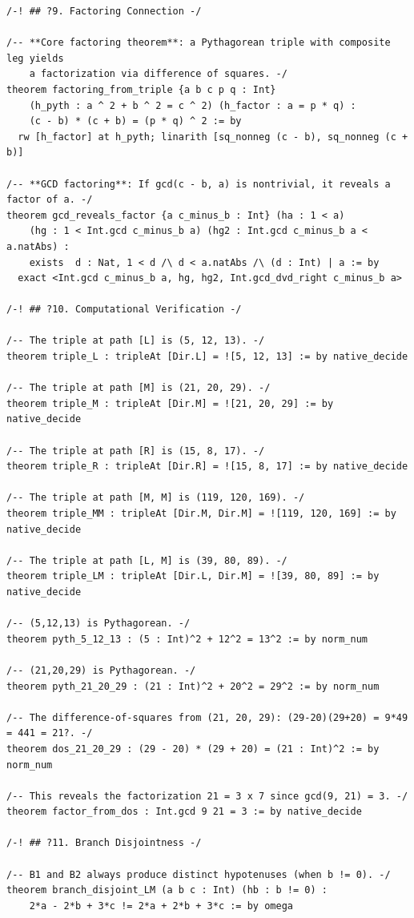 \documentclass[11pt,twoside,openright]{book}
\theoremstyle{definition}
\theoremstyle{remark}
\begin{document}
\begin{lstlisting}[style=lean]
/-! ## ?9. Factoring Connection -/

/-- **Core factoring theorem**: a Pythagorean triple with composite leg yields
    a factorization via difference of squares. -/
theorem factoring_from_triple {a b c p q : Int}
    (h_pyth : a ^ 2 + b ^ 2 = c ^ 2) (h_factor : a = p * q) :
    (c - b) * (c + b) = (p * q) ^ 2 := by
  rw [h_factor] at h_pyth; linarith [sq_nonneg (c - b), sq_nonneg (c + b)]

/-- **GCD factoring**: If gcd(c - b, a) is nontrivial, it reveals a factor of a. -/
theorem gcd_reveals_factor {a c_minus_b : Int} (ha : 1 < a)
    (hg : 1 < Int.gcd c_minus_b a) (hg2 : Int.gcd c_minus_b a < a.natAbs) :
    exists  d : Nat, 1 < d /\ d < a.natAbs /\ (d : Int) | a := by
  exact <Int.gcd c_minus_b a, hg, hg2, Int.gcd_dvd_right c_minus_b a>

/-! ## ?10. Computational Verification -/

/-- The triple at path [L] is (5, 12, 13). -/
theorem triple_L : tripleAt [Dir.L] = ![5, 12, 13] := by native_decide

/-- The triple at path [M] is (21, 20, 29). -/
theorem triple_M : tripleAt [Dir.M] = ![21, 20, 29] := by native_decide

/-- The triple at path [R] is (15, 8, 17). -/
theorem triple_R : tripleAt [Dir.R] = ![15, 8, 17] := by native_decide

/-- The triple at path [M, M] is (119, 120, 169). -/
theorem triple_MM : tripleAt [Dir.M, Dir.M] = ![119, 120, 169] := by native_decide

/-- The triple at path [L, M] is (39, 80, 89). -/
theorem triple_LM : tripleAt [Dir.L, Dir.M] = ![39, 80, 89] := by native_decide

/-- (5,12,13) is Pythagorean. -/
theorem pyth_5_12_13 : (5 : Int)^2 + 12^2 = 13^2 := by norm_num

/-- (21,20,29) is Pythagorean. -/
theorem pyth_21_20_29 : (21 : Int)^2 + 20^2 = 29^2 := by norm_num

/-- The difference-of-squares from (21, 20, 29): (29-20)(29+20) = 9*49 = 441 = 21?. -/
theorem dos_21_20_29 : (29 - 20) * (29 + 20) = (21 : Int)^2 := by norm_num

/-- This reveals the factorization 21 = 3 x 7 since gcd(9, 21) = 3. -/
theorem factor_from_dos : Int.gcd 9 21 = 3 := by native_decide

/-! ## ?11. Branch Disjointness -/

/-- B1 and B2 always produce distinct hypotenuses (when b != 0). -/
theorem branch_disjoint_LM (a b c : Int) (hb : b != 0) :
    2*a - 2*b + 3*c != 2*a + 2*b + 3*c := by omega


\end{lstlisting}
\end{document}

